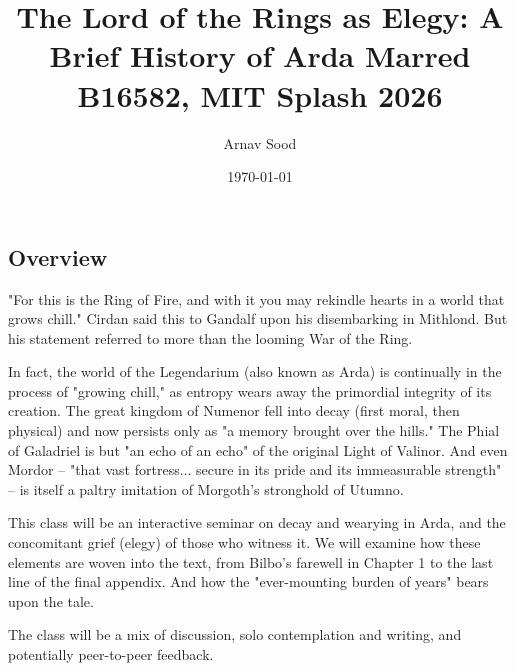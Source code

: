 \documentclass[12pt,oneside]{amsart}
\title{The Lord of the Rings as Elegy: A Brief History of Arda Marred \\ B16582, MIT Splash 2026}
\author{Arnav Sood}
\date{\today}
\theoremstyle{definition}
\begin{document}
\maketitle

\subsection*{Overview} "For this is the Ring of Fire, and with it you may rekindle hearts in a world that grows chill." Cirdan said this to Gandalf upon his disembarking in Mithlond. But his statement referred to more than the looming War of the Ring.

In fact, the world of the Legendarium (also known as Arda) is continually in the process of "growing chill," as entropy wears away the primordial integrity of its creation. The great kingdom of Numenor fell into decay (first moral, then physical) and now persists only as "a memory brought over the hills." The Phial of Galadriel is but "an echo of an echo" of the original Light of Valinor. And even Mordor -- "that vast fortress... secure in its pride and its immeasurable strength" -- is itself a paltry imitation of Morgoth's stronghold of Utumno.

This class will be an interactive seminar on decay and wearying in Arda, and the concomitant grief (elegy) of those who witness it. We will examine how these elements are woven into the text, from Bilbo's farewell in Chapter 1 to the last line of the final appendix. And how the "ever-mounting burden of years" bears upon the tale.

The class will be a mix of discussion, solo contemplation and writing, and potentially peer-to-peer feedback.




\end{document}
